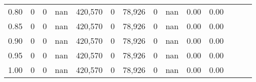 \begin{tabular}{rrrrrrrrrrrrrr}
0.80 &        0 &       0 &   nan &  420,570 &        0 &  78,926 &       0 &   nan &  0.00 &      0.00 \\
0.85 &        0 &       0 &   nan &  420,570 &        0 &  78,926 &       0 &   nan &  0.00 &      0.00 \\
0.90 &        0 &       0 &   nan &  420,570 &        0 &  78,926 &       0 &   nan &  0.00 &      0.00 \\
0.95 &        0 &       0 &   nan &  420,570 &        0 &  78,926 &       0 &   nan &  0.00 &      0.00 \\
1.00 &        0 &       0 &   nan &  420,570 &        0 &  78,926 &       0 &   nan &  0.00 &      0.00 \\
\bottomrule
\end{tabular}
